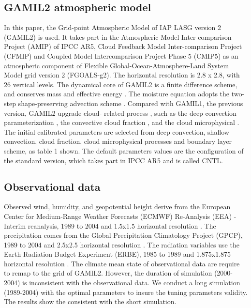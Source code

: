 \documentclass[gmd, manuscript]{copernicus}
\begin{document}
\subsection{GAMIL2 atmospheric model} 
In this paper, the Grid-point Atmospheric Model of IAP LASG version 2 (GAMIL2) is used. It takes
part in the Atmospheric Model Inter-comparison Project (AMIP) of IPCC AR5, Cloud Feedback Model
Inter-comparison Project (CFMIP) and  Coupled Model Intercomparison Project Phase 5 (CMIP5) as an
atmospheric component of Flexible Global-Ocean-Atmosphere-Land System Model grid version 2
(FGOALS-g2). The horizontal resolution is 2.8 x 2.8, with 26 vertical levels. The dynamical core of
GAMIL2 is a finite difference scheme, and conserves mass and effective energy
\citep{wang2004design}. The moisture equation adopts the two- step shape-preserving advection
scheme \citep{rucong1994two}. Compared with GAMIL1, the previous version, GAMIL2 upgrade cloud-
related process \citep{li2013evaluation}, such as the deep convection parameterization
\citep{zhang2005effects}, the convective cloud fraction \citep{xu1991evaluation}, and the cloud
microphysical \citep{morrison2008new}. The initial calibrated parameters are selected  from deep
convection, shallow convection, cloud fraction, cloud microphysical processes and boundary layer
scheme, as table 1 shown. The default parameters values are the configuration of the standard
version, which takes part in IPCC AR5 and is called CNTL.


\subsection{Observational data}
Observed wind, humidity, and geopotential height derive from the European Center for Medium-Range
Weather Forecasts (ECMWF) Re-Analysis (EEA) - Interim reanalysis, 1989 to 2004 and 1.5x1.5
horizontal resolution \citep{simmons2007era}. The precipitation comes from the Global Precipitation
Climatology Project (GPCP), 1989 to 2004 and 2.5x2.5 horizontal resolution \citep{adler2003version}
. The radiation variables use the Earth Radiation Budget Experiment (ERBE), 1985 to 1989  and
1.875x1.875 horizontal resolution \citep{barkstrom1984earth}. The climate mean state of
observational data are require to  remap to the grid of GAMIL2. However, the duration of simulation
(2000-2004)  is inconsistent with the observational data. We conduct a long simulation (1989-2004)
with the optimal parameters to insure the tuning parameters validity. The results show the
consistent with the short simulation.
\end{document}

